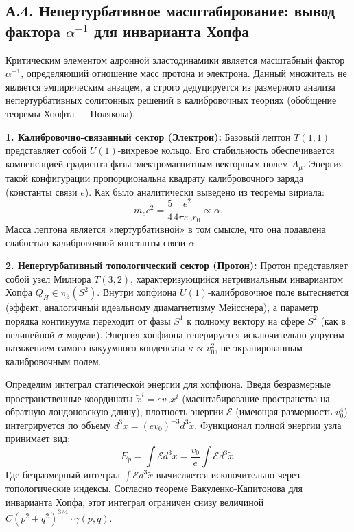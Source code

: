 \documentclass[11pt,a4paper]{article}
\begin{document}
	\subsection*{А.4. Непертурбативное масштабирование: вывод фактора $\alpha^{-1}$ для инварианта Хопфа}
	
	Критическим элементом адронной эластодинамики является масштабный фактор $\alpha^{-1}$, определяющий отношение масс протона и электрона. Данный множитель не является эмпирическим анзацем, а строго дедуцируется из размерного анализа непертурбативных солитонных решений в калибровочных теориях (обобщение теоремы Хоофта — Полякова).
	
	\textbf{1. Калибровочно-связанный сектор (Электрон):}
	Базовый лептон $T(1,1)$ представляет собой $U(1)$-вихревое кольцо. Его стабильность обеспечивается компенсацией градиента фазы электромагнитным векторным полем $A_\mu$. Энергия такой конфигурации пропорциональна квадрату калибровочного заряда (константы связи $e$). Как было аналитически выведено из теоремы вириала:
	\begin{equation}
		m_e c^2 = \frac{5}{4} \frac{e^2}{4\pi\varepsilon_0 r_0} \propto \alpha.
		\label{eq:me_scaling}
	\end{equation}
	Масса лептона является «пертурбативной» в том смысле, что она подавлена слабостью калибровочной константы связи $\alpha$.
	
	\textbf{2. Непертурбативный топологический сектор (Протон):}
	Протон представляет собой узел Милнора $T(3,2)$, характеризующийся нетривиальным инвариантом Хопфа $Q_H \in \pi_3(S^2)$. 
	Внутри хопфиона $U(1)$-калибровочное поле вытесняется (эффект, аналогичный идеальному диамагнетизму Мейсснера), а параметр порядка континуума переходит от фазы $S^1$ к полному вектору на сфере $S^2$ (как в нелинейной $\sigma$-модели). Энергия хопфиона генерируется исключительно упругим натяжением самого вакуумного конденсата $\kappa \propto v_0^2$, не экранированным калибровочным полем.
	
	Определим интеграл статической энергии для хопфиона. Введя безразмерные пространственные координаты $\tilde{x}^i = e v_0 x^i$ (масштабирование пространства на обратную лондоновскую длину), плотность энергии $\mathcal{E}$ (имеющая размерность $v_0^4$) интегрируется по объему $d^3x = (e v_0)^{-3} d^3\tilde{x}$.
	Функционал полной энергии узла принимает вид:
	\begin{equation}
		E_p = \int \mathcal{E} d^3x = \frac{v_0}{e} \int \tilde{\mathcal{E}} d^3\tilde{x}.
	\end{equation}
	Где безразмерный интеграл $\int \tilde{\mathcal{E}} d^3\tilde{x}$ вычисляется исключительно через топологические индексы. Согласно теореме Вакуленко-Капитонова для инварианта Хопфа, этот интеграл ограничен снизу величиной $C (p^2+q^2)^{3/4} \cdot \gamma(p,q)$.
	
\end{document}
